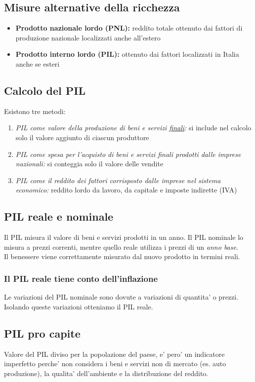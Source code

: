 \documentclass{report}
\begin{document}
	\subsection{Misure alternative della ricchezza}
	\begin{itemize}
		\item \textbf{Prodotto nazionale lordo (PNL):} reddito totale ottenuto dai fattori di produzione nazionale localizzati anche all'estero
		\item \textbf{Prodotto interno lordo (PIL):} ottenuto dai fattori localizzati in Italia anche se esteri
	\end{itemize}
	\subsection{Calcolo del PIL}
	Esistono tre metodi:
	\begin{enumerate}
		\item \textit{PIL come valore della produzione di beni e servizi \underline{finali}:} si include nel calcolo solo il valore aggiunto di ciascun produttore
		\item \textit{PIL come spesa per l'acquisto di beni e servizi finali prodotti dalle imprese nazionali:} si conteggia solo il valore delle vendite
		\item \textit{PIL come il reddito dei fattori corrisposto dalle imprese nel sistema economico:} reddito lordo da lavoro, da capitale e imposte indirette (IVA)
	\end{enumerate}
	\subsection{PIL reale e nominale}
	Il PIL misura il valore di beni e servizi prodotti in un anno. Il PIL nominale lo misura a prezzi correnti, mentre quello reale utilizza i prezzi di un \textit{anno base}.
	\medskip \\
	Il benessere viene correttamente misurato dal nuovo prodotto in termini reali.
	\subsubsection{Il PIL reale tiene conto dell'inflazione}
	Le variazioni del PIL nominale sono dovute a variazioni di quantita' o prezzi. Isolando queste variazioni otteniamo il PIL reale.
	\subsection{PIL pro capite}
	Valore del PIL diviso per la popolazione del paese, e' pero' un indicatore imperfetto perche' non considera i beni e servizi non di mercato (es. auto produzione), la qualita' dell'ambiente e la distribuzione del reddito.
\end{document}
